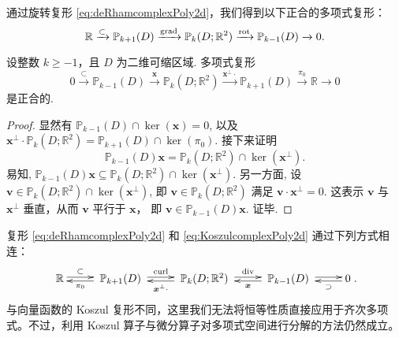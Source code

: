 通过旋转复形 \eqref{eq:deRhamcomplexPoly2d}，我们得到以下正合的多项式复形：
\begin{equation*}
\mathbb R\xrightarrow{\subset} \mathbb P_{k+1}(D)\xrightarrow{\operatorname{grad}} \mathbb P_k(D;\mathbb R^2) \xrightarrow{\operatorname*{rot}} \mathbb P_{k-1}(D)\xrightarrow{}0.
\end{equation*}


\begin{lemma}
设整数 $k\geq-1$，且 $D$ 为二维可缩区域.
多项式复形
\begin{equation}\label{eq:KoszulcomplexPoly2d}
0\xrightarrow{\subset}\mathbb P_{k-1}(D) \xrightarrow{\boldsymbol x} \mathbb P_k(D;\mathbb R^2) \xrightarrow{\boldsymbol x^{\perp}\cdot} \mathbb P_{k+1}(D)\xrightarrow{\pi_{0}}\mathbb R\xrightarrow{}0
\end{equation}
是正合的.  
\end{lemma}
\begin{proof}
显然有 $\mathbb P_{k-1}(D)\cap\ker(\boldsymbol{x})=0$, 以及 $\boldsymbol x^{\perp}\cdot\mathbb P_k(D;\mathbb R^2)=\mathbb P_{k+1}(D)\cap\ker(\pi_0)$. 接下来证明
$$
\mathbb P_{k-1}(D)\boldsymbol{x} = \mathbb P_k(D;\mathbb R^2)\cap\ker(\boldsymbol x^{\perp}).
$$ 
易知, $\mathbb P_{k-1}(D)\boldsymbol{x} \subseteq \mathbb P_k(D;\mathbb R^2)\cap\ker(\boldsymbol x^{\perp})$. 另一方面, 设 $\boldsymbol{v}\in\mathbb P_k(D;\mathbb R^2)\cap\ker(\boldsymbol x^{\perp})$, 即 $\boldsymbol{v}\in\mathbb P_k(D;\mathbb R^2)$ 满足 $\boldsymbol{v}\cdot \boldsymbol x^{\perp}=0$. 这表示 $\boldsymbol{v}$ 与 $\boldsymbol x^{\perp}$ 垂直，从而 $\boldsymbol{v}$ 平行于 $\boldsymbol{x}$， 即 $\boldsymbol{v}\in \mathbb P_{k-1}(D)\boldsymbol{x}$. 证毕.
\end{proof}

复形 \eqref{eq:deRhamcomplexPoly2d} 和 \eqref{eq:KoszulcomplexPoly2d} 通过下列方式相连：
\begin{equation}\label{eq:deRhamcomplexPolydouble2d}
\xymatrix{
\mathbb R\ar@<0.4ex>[r]^-{\subset} & \; \mathbb P_{k+1}(D)\; \ar@<0.4ex>[r]^-{\curl}\ar@<0.4ex>[l]^-{\pi_0}  & \; \mathbb P_k(D;\mathbb R^2) \ar@<0.4ex>[r]^-{\div}\; \ar@<0.4ex>[l]^-{\boldsymbol x^{\bot}\cdot} & \; \mathbb P_{k-1}(D)  \; \ar@<0.4ex>[r]^-{} \ar@<0.4ex>[l]^-{\boldsymbol x}
& 0 \ar@<0.4ex>[l]^-{\supset} }.
\end{equation}
与向量函数的 Koszul 复形不同，这里我们无法将恒等性质直接应用于齐次多项式。不过，利用 Koszul 算子与微分算子对多项式空间进行分解的方法仍然成立。


